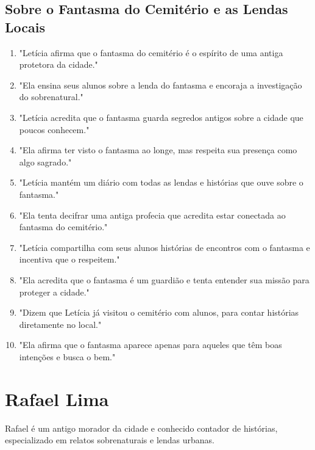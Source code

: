 \subsection*{Sobre o Fantasma do Cemitério e as Lendas Locais}
\begin{enumerate}
    \item "Letícia afirma que o fantasma do cemitério é o espírito de uma antiga protetora da cidade."
    \item "Ela ensina seus alunos sobre a lenda do fantasma e encoraja a investigação do sobrenatural."
    \item "Letícia acredita que o fantasma guarda segredos antigos sobre a cidade que poucos conhecem."
    \item "Ela afirma ter visto o fantasma ao longe, mas respeita sua presença como algo sagrado."
    \item "Letícia mantém um diário com todas as lendas e histórias que ouve sobre o fantasma."
    \item "Ela tenta decifrar uma antiga profecia que acredita estar conectada ao fantasma do cemitério."
    \item "Letícia compartilha com seus alunos histórias de encontros com o fantasma e incentiva que o respeitem."
    \item "Ela acredita que o fantasma é um guardião e tenta entender sua missão para proteger a cidade."
    \item "Dizem que Letícia já visitou o cemitério com alunos, para contar histórias diretamente no local."
    \item "Ela afirma que o fantasma aparece apenas para aqueles que têm boas intenções e busca o bem."
\end{enumerate}

\section{Rafael Lima}
Rafael é um antigo morador da cidade e conhecido contador de histórias, especializado em relatos sobrenaturais e lendas urbanas.

